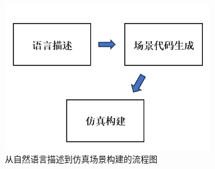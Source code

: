 \begin{figure}[H]
	\centering
	\includegraphics[width=0.8\textwidth]{"images/流程图1.png"}
	\caption{从自然语言描述到仿真场景构建的流程图}
	\label{fig:flowchart}
\end{figure}